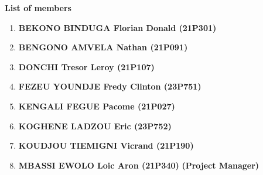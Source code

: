 
\begin{flushleft}
    \textbf{List of members}
\end{flushleft}
\vspace{0.05cm}
\begin{enumerate}
    \item \textbf{BEKONO BINDUGA Florian Donald (21P301) }\\[0.05cm]
    \item \textbf{BENGONO AMVELA Nathan (21P091) }\\[0.05cm]
    \item \textbf{DONCHI Tresor Leroy (21P107) }\\[0.05cm]
    \item \textbf{FEZEU YOUNDJE Fredy Clinton (23P751) }\\[0.05cm]
    \item \textbf{KENGALI FEGUE Pacome (21P027) } \\[0.05cm]
    \item \textbf{KOGHENE LADZOU Eric (23P752) } \\[0.05cm]
    \item \textbf{KOUDJOU TIEMIGNI Vicrand (21P190) } \\[0.05cm]
    \item \textbf{MBASSI EWOLO Loic Aron (21P340) } \textbf{(Project Manager) }  \\[0.05cm]

\end{enumerate}
